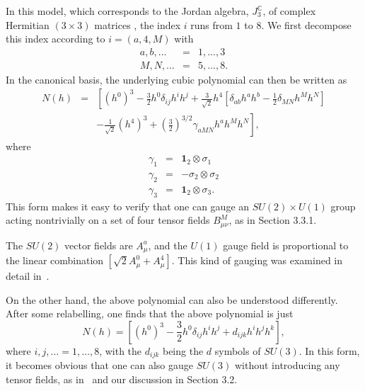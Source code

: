\documentclass[a4paper,11pt]{article}
\begin{document}
\begin{appendix}
In this model, which corresponds to the Jordan algebra,
$J_{3}^{\mathbb{C}}$, of complex Hermitian $(3\times3)$ matrices
\cite{GST1}, the index $i$ runs from $1$ to $8$.
We first  decompose this index according to
$i = (a,4,M)$ with
\begin{eqnarray}
a,b,\ldots&=&1,\ldots,3\nonumber\\
M,N,\ldots&=&5,\ldots,8\nonumber.
\end{eqnarray}
In the canonical basis, the underlying cubic polynomial can then
be written as
\begin{eqnarray}
N(h)&=&\left[(h^{0})^{3}-\frac{3}{2}
h^{0}\delta_{ij}h^{i}h^{j}+\frac{3}{\sqrt{2}}h^{4}[\delta_{ab}h^{a}h^{b}-
\frac{1}{2}\delta_{MN}
h^{M}h^{N}]\right.\nonumber\\
& &\left.-\frac{1}{\sqrt{2}}(h^{4})^{3}+\left(\frac{3}{2}\right)^{3/2}
\gamma_{aMN} h^{a}h^{M}h^{N}\right],\label{complexmagical}
\end{eqnarray}
where
\begin{eqnarray}
\gamma_{1}&=&\mathbf{1}_{2}\otimes \sigma_{1}\nonumber\\
\gamma_{2}&=&-\sigma_{2}\otimes\sigma_{2}\nonumber\\
\gamma_{3}&=&\mathbf{1}_{2}\otimes \sigma_{3}\nonumber.
\end{eqnarray}
This form makes it easy to verify  that one can gauge an
$SU(2)\times U(1)$ group acting nontrivially on a set of four
tensor fields $B_{\mu\nu}^{M}$, as in Section 3.3.1.

The $SU(2)$ vector fields are $A_{\mu}^{a}$, and the $U(1)$ gauge
field is proportional to the linear combination $[\sqrt{2}
A_{\mu}^{0}+A_{\mu}^{4}]$. This kind of gauging was examined in
detail in~\cite{GZ3}.

On the other hand, the above polynomial can also be understood
differently. After some relabelling, one finds that the above
polynomial is just
\begin{displaymath}
N(h)=\left[(h^{0})^{3}-\frac{3}{2}h^{0}
\delta_{ij}h^{i}h^{j}+d_{ijk}h^{i}h^{j}h^{k}\right],
\end{displaymath}
where  $i,j,\ldots=1,\ldots, 8$, with the $d_{ijk}$ being the
$d$ symbols of $SU(3)$. In this form, it becomes obvious that one
can also gauge $SU(3)$ without introducing any tensor fields, as
in~\cite{GST2} and our discussion in Section 3.2.


\end{appendix}
\end{document}
